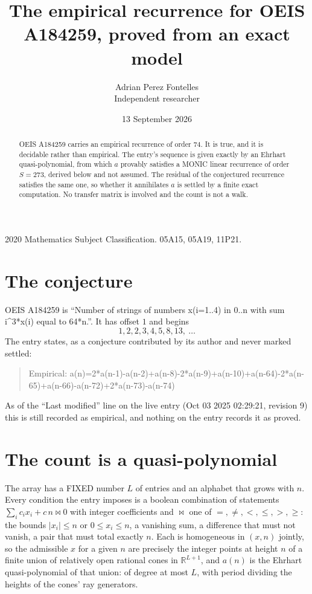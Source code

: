 \documentclass[11pt,a4paper]{article}
\title{The empirical recurrence for OEIS A184259, proved from an exact model}
\author{Adrian Perez Fontelles\\ \small Independent researcher}
\date{13 September 2026}
\theoremstyle{plain}
\theoremstyle{definition}
\begin{document}
\maketitle

\begin{abstract}
OEIS A184259 carries an empirical recurrence of order $74$. It is true, and it is
decidable rather than empirical. The entry's sequence is given exactly by an Ehrhart quasi-polynomial, from
which $a$ provably satisfies a MONIC linear recurrence of order $S=273$, derived below and not
assumed. The residual of the conjectured recurrence satisfies the same one, so whether it
annihilates $a$ is settled by a finite exact computation. No transfer matrix is involved and
the count is not a walk.
\end{abstract}

\noindent\small 2020 Mathematics Subject Classification. 05A15, 05A19, 11P21.\normalsize

\section{The conjecture}

OEIS A184259 is ``Number of strings of numbers x(i=1..4) in 0..n with sum i\^{}3*x(i) equal to 64*n.''. It has offset $1$ and begins
\[
1, 2, 2, 3, 4, 5, 8, 13,\ \dots
\]
The entry states, as a conjecture contributed by its author and never marked settled:
\begin{quote}
Empirical: a(n)=2*a(n-1)-a(n-2)+a(n-8)-2*a(n-9)+a(n-10)+a(n-64)-2*a(n-65)+a(n-66)-a(n-72)+2*a(n-73)-a(n-74)
\end{quote}
As of the ``Last modified'' line on the live entry (Oct 03 2025 02:29:21, revision 9)
this is still recorded as empirical, and nothing on the entry records it as proved.

\section{The count is a quasi-polynomial}

The array has a FIXED number $L$ of entries and an alphabet that grows with $n$. Every
condition the entry imposes is a boolean combination of statements
$\sum_i c_ix_i + c\,n \bowtie 0$ with integer coefficients and $\bowtie$ one of
$=,\ne,<,\le,>,\ge$: the bounds $|x_i|\le n$ or $0\le x_i\le n$, a vanishing sum, a difference
that must not vanish, a pair that must total exactly $n$. Each is homogeneous in $(x,n)$
jointly, so the admissible $x$ for a given $n$ are precisely the integer points at height $n$
of a finite union of relatively open rational cones in $\mathbb{R}^{L+1}$, and $a(n)$ is
the Ehrhart quasi-polynomial of that union: of degree at most $L$, with period dividing the
heights of the cones' ray generators.
\end{document}
